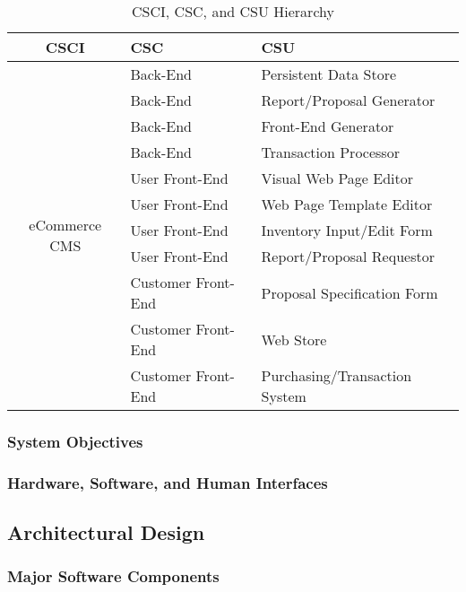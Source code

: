 \documentclass{article}
\begin{document}
\begin{table}
    \begin{tabular}{|c|l|p{7.5cm}|}\hline
        CSCI & CSC & CSU \\\hline\hline
        \multirow{12}{*}{eCommerce CMS}
         & Back-End & Persistent Data Store \\\cline{2-3}
         & Back-End & Report/Proposal Generator \\\cline{2-3}
         & Back-End & Front-End Generator \\\cline{2-3}
         & Back-End & Transaction Processor \\\cline{2-3}
         & User Front-End & Visual Web Page Editor \\\cline{2-3}
         & User Front-End & Web Page Template Editor \\\cline{2-3}
         & User Front-End & Inventory Input/Edit Form \\\cline{2-3}
         & User Front-End & Report/Proposal Requestor \\\cline{2-3}
         & Customer Front-End & Proposal Specification Form \\\cline{2-3}
         & Customer Front-End & Web Store \\\cline{2-3}
         & Customer Front-End & Purchasing/Transaction System \\\hline
    \end{tabular}
    \caption{CSCI, CSC, and CSU Hierarchy}
    \label{software-hierarchy}
\end{table}

\subsubsection{System Objectives}

\subsubsection{Hardware, Software, and Human Interfaces}

\pagebreak
\subsection{Architectural Design}

\subsubsection{Major Software Components}
\label{msc}
\end{document}
